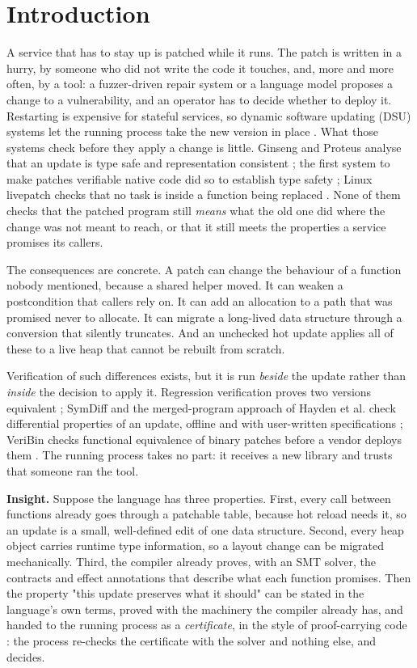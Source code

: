 \documentclass[10pt,twocolumn]{article}
\begin{document}
\section{Introduction}\label{sec-intro}
A service that has to stay up is patched while it runs. The patch is written in a hurry, by someone who did not write the code it touches, and, more and more often, by a tool: a fuzzer-driven repair system or a language model proposes a change to a vulnerability, and an operator has to decide whether to deploy it. Restarting is expensive for stateful services, so dynamic software updating (DSU) systems let the running process take the new version in place \cite{hicks2001dsu,neamtiu2006ginseng,hayden2012kitsune,arnold2009ksplice,pina2014rubah}. What those systems check before they apply a change is little. Ginseng and Proteus analyse that an update is type safe and representation consistent \cite{neamtiu2006ginseng,stoyle2005proteus}; the first system to make patches verifiable native code did so to establish type safety \cite{hicks2001dsu}; Linux livepatch checks that no task is inside a function being replaced \cite{livepatch}. None of them checks that the patched program still \emph{means} what the old one did where the change was not meant to reach, or that it still meets the properties a service promises its callers.

The consequences are concrete. A patch can change the behaviour of a function nobody mentioned, because a shared helper moved. It can weaken a postcondition that callers rely on. It can add an allocation to a path that was promised never to allocate. It can migrate a long-lived data structure through a conversion that silently truncates. And an unchecked hot update applies all of these to a live heap that cannot be rebuilt from scratch.

Verification of such differences exists, but it is run \emph{beside} the update rather than \emph{inside} the decision to apply it. Regression verification proves two versions equivalent \cite{godlin2013regression}; SymDiff and the merged-program approach of Hayden et al. check differential properties of an update, offline and with user-written specifications \cite{lahiri2012symdiff,hayden2012correctness}; VeriBin checks functional equivalence of binary patches before a vendor deploys them \cite{wu2025veribin}. The running process takes no part: it receives a new library and trusts that someone ran the tool.

\textbf{Insight.} Suppose the language has three properties. First, every call between functions already goes through a patchable table, because hot reload needs it, so an update is a small, well-defined edit of one data structure. Second, every heap object carries runtime type information, so a layout change can be migrated mechanically. Third, the compiler already proves, with an SMT solver, the contracts and effect annotations that describe what each function promises. Then the property "this update preserves what it should" can be stated in the language's own terms, proved with the machinery the compiler already has, and handed to the running process as a \emph{certificate}, in the style of proof-carrying code \cite{necula1996pcc}: the process re-checks the certificate with the solver and nothing else, and decides.
\end{document}
